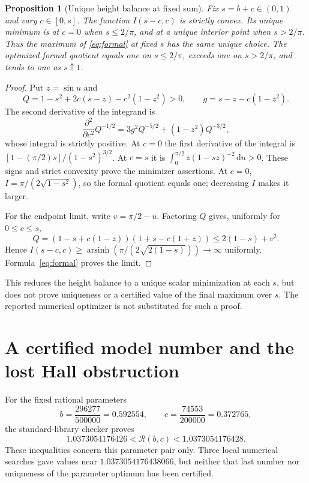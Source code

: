 \documentclass[11pt]{article}
\newtheorem{proposition}[theorem]{Proposition}
\theoremstyle{remark}
\newcommand{\dd}{\,\mathrm{d}}
\newcommand{\Rformal}{\mathcal R}
\begin{document}
\begin{proposition}[Unique height balance at fixed sum]\label{prop:convex}
Fix $s=b+c\in(0,1)$ and vary $c\in[0,s]$. The function $I(s-c,c)$ is strictly convex. Its unique minimum is at $c=0$ when $s\le2/\pi$, and at a unique interior point when $s>2/\pi$. Thus the maximum of \eqref{eq:formal} at fixed $s$ has the same unique choice. The optimized formal quotient equals one on $s\le2/\pi$, exceeds one on $s>2/\pi$, and tends to one as $s\uparrow1$.
\end{proposition}
\begin{proof}
Put $z=\sin u$ and
\[
 Q=1-s^2+2c(s-z)-c^2(1-z^2)>0,\qquad g=s-z-c(1-z^2).
\]
The second derivative of the integrand is
\[
 \frac{\partial^2}{\partial c^2}Q^{-1/2}
 =3g^2Q^{-5/2}+(1-z^2)Q^{-3/2},
\]
whose integral is strictly positive. At $c=0$ the first derivative of the integral is
$[1-(\pi/2)s]/(1-s^2)^{3/2}$. At $c=s$ it is
$\int_0^{\pi/2}z(1-sz)^{-2}\dd u>0$. These signs and strict convexity prove the minimizer assertions. At $c=0$, $I=\pi/(2\sqrt{1-s^2})$, so the formal quotient equals one; decreasing $I$ makes it larger.

For the endpoint limit, write $v=\pi/2-u$. Factoring $Q$ gives, uniformly for $0\le c\le s$,
\[
 Q=(1-s+c(1-z))(1+s-c(1+z))\le2(1-s)+v^2.
\]
Hence $I(s-c,c)\ge\operatorname{arsinh}(\pi/(2\sqrt{2(1-s)}))\to\infty$ uniformly. Formula~\eqref{eq:formal} proves the limit.
\end{proof}
This reduces the height balance to a unique scalar minimization at each $s$, but does not prove uniqueness or a certified value of the final maximum over $s$. The reported numerical optimizer is not substituted for such a proof.

\section{A certified model number and the lost Hall obstruction}
For the fixed rational parameters
\begin{equation}\label{eq:chosen}
 b=\frac{296277}{500000}=0.592554,\qquad
 c=\frac{74553}{200000}=0.372765,
\end{equation}
the standard-library checker proves
\begin{equation}\label{eq:certified-model}
 \boxed{1.0373054176426<\Rformal(b,c)<1.0373054176428.}
\end{equation}
These inequalities concern this parameter pair only. Three local numerical searches gave values near $1.0373054176438066$, but neither that last number nor uniqueness of the parameter optimum has been certified.
\end{document}
